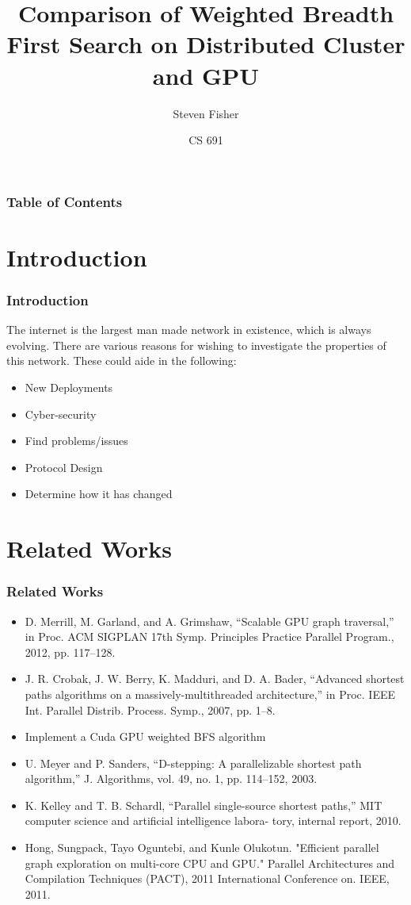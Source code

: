 \documentclass{beamer}
\title[CS 691]{Comparison of Weighted Breadth First Search on Distributed Cluster and GPU}
\author{Steven Fisher}
\institute[UNR]{University of Nevada, Reno}
\date
{CS 691}
\begin{document}
\frame{\titlepage}
\begin{frame}
    \frametitle{Table of Contents}
    \tableofcontents
\end{frame}

\section{Introduction}
\begin{frame}
  \frametitle{Introduction}  
  The internet is the largest man made network in existence, which is always evolving. There are various reasons for wishing to investigate the properties of this network. These could aide in the following:
  \begin{itemize}
  \item{New Deployments}
  \item{Cyber-security}
  \item{Find problems/issues}
  \item{Protocol Design}
  \item{Determine how it has changed}
  \end{itemize}    
\end{frame}
\section{Related Works}
\begin{frame}
  \frametitle{Related Works}
  \begin{itemize}
  \item{D. Merrill, M. Garland, and A. Grimshaw, “Scalable GPU graph traversal,” in Proc. ACM SIGPLAN 17th Symp. Principles Practice Parallel Program., 2012, pp. 117–128.}
  \item{J. R. Crobak, J. W. Berry, K. Madduri, and D. A. Bader, “Advanced
shortest paths algorithms on a massively-multithreaded
architecture,” in Proc. IEEE Int. Parallel Distrib. Process. Symp.,
2007, pp. 1–8.}
  \item{Implement a Cuda GPU weighted BFS algorithm}
  \item{U. Meyer and P. Sanders, “D-stepping: A parallelizable shortest
path algorithm,” J. Algorithms, vol. 49, no. 1, pp. 114–152, 2003.}
  \item{K. Kelley and T. B. Schardl, “Parallel single-source shortest
paths,” MIT computer science and artificial intelligence labora-
tory, internal report, 2010.}
  \item{Hong, Sungpack, Tayo Oguntebi, and Kunle Olukotun. "Efficient parallel graph exploration on multi-core CPU and GPU." Parallel Architectures and Compilation Techniques (PACT), 2011 International Conference on. IEEE, 2011.}
  \end{itemize}
\end{frame}
\end{document}
